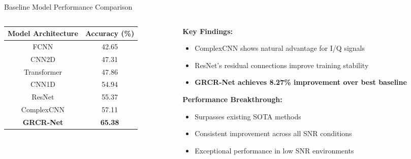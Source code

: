 \documentclass[aspectratio=169]{beamer}
\begin{document}
\begin{frame}{Baseline Model Performance Comparison}
\begin{columns}
\begin{column}{0.5\textwidth}
\begin{table}[h]
\centering
\begin{tabular}{@{}cc@{}}
\toprule
\textbf{Model Architecture} & \textbf{Accuracy (\%)} \\
\midrule
FCNN & 42.65 \\
CNN2D & 47.31 \\
Transformer & 47.86 \\
CNN1D & 54.94 \\
ResNet & 55.37 \\
ComplexCNN & 57.11 \\
\midrule
\textcolor{zjutred}{\textbf{GRCR-Net}} & \textcolor{zjutred}{\textbf{65.38}} \\
\bottomrule
\end{tabular}
\end{table}
\end{column}
\begin{column}{0.5\textwidth}
\textbf{Key Findings:}
\begin{itemize}
\item ComplexCNN shows natural advantage for I/Q signals
\item ResNet's residual connections improve training stability
\item \textcolor{zjutred}{\textbf{GRCR-Net achieves 8.27\% improvement over best baseline}}
\end{itemize}

\vspace{0.5cm}
\textbf{Performance Breakthrough:}
\begin{itemize}
\item Surpasses existing SOTA methods
\item Consistent improvement across all SNR conditions
\item Exceptional performance in low SNR environments
\end{itemize}
\end{column}
\end{columns}
\end{frame}
\end{document}
